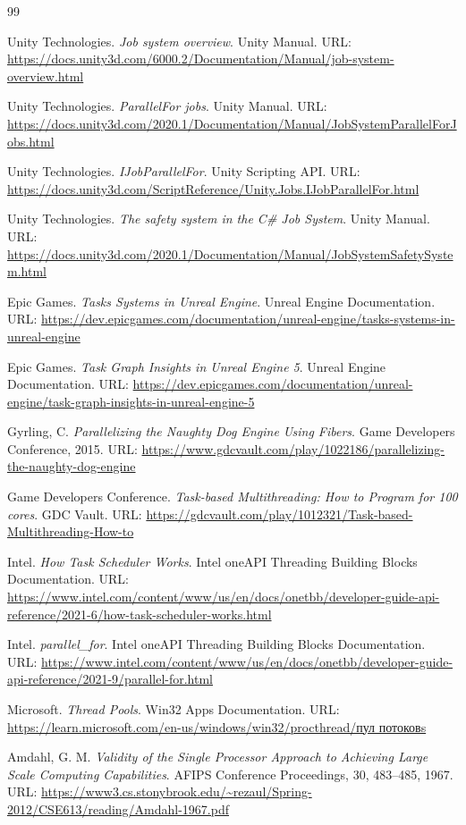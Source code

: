 \documentclass[14pt,a4paper,oneside]{extreport}
\begin{document}
\begin{thebibliography}{99}

Unity Technologies.
\textit{Job system overview}.
Unity Manual.
URL: \url{https://docs.unity3d.com/6000.2/Documentation/Manual/job-system-overview.html}

Unity Technologies.
\textit{ParallelFor jobs}.
Unity Manual.
URL: \url{https://docs.unity3d.com/2020.1/Documentation/Manual/JobSystemParallelForJobs.html}

Unity Technologies.
\textit{IJobParallelFor}.
Unity Scripting API.
URL: \url{https://docs.unity3d.com/ScriptReference/Unity.Jobs.IJobParallelFor.html}

Unity Technologies.
\textit{The safety system in the C\# Job System}.
Unity Manual.
URL: \url{https://docs.unity3d.com/2020.1/Documentation/Manual/JobSystemSafetySystem.html}

Epic Games.
\textit{Tasks Systems in Unreal Engine}.
Unreal Engine Documentation.
URL: \url{https://dev.epicgames.com/documentation/unreal-engine/tasks-systems-in-unreal-engine}

Epic Games.
\textit{Task Graph Insights in Unreal Engine 5}.
Unreal Engine Documentation.
URL: \url{https://dev.epicgames.com/documentation/unreal-engine/task-graph-insights-in-unreal-engine-5}

Gyrling, C.
\textit{Parallelizing the Naughty Dog Engine Using Fibers}.
Game Developers Conference, 2015.
URL: \url{https://www.gdcvault.com/play/1022186/parallelizing-the-naughty-dog-engine}

Game Developers Conference.
\textit{Task-based Multithreading: How to Program for 100 cores}.
GDC Vault.
URL: \url{https://gdcvault.com/play/1012321/Task-based-Multithreading-How-to}

Intel.
\textit{How Task Scheduler Works}.
Intel oneAPI Threading Building Blocks Documentation.
URL: \url{https://www.intel.com/content/www/us/en/docs/onetbb/developer-guide-api-reference/2021-6/how-task-scheduler-works.html}

Intel.
\textit{parallel\_for}.
Intel oneAPI Threading Building Blocks Documentation.
URL: \url{https://www.intel.com/content/www/us/en/docs/onetbb/developer-guide-api-reference/2021-9/parallel-for.html}

Microsoft.
\textit{Thread Pools}.
Win32 Apps Documentation.
URL: \url{https://learn.microsoft.com/en-us/windows/win32/procthread/пул потоковs}

Amdahl, G. M.
\textit{Validity of the Single Processor Approach to Achieving Large Scale Computing Capabilities}.
AFIPS Conference Proceedings, 30, 483--485, 1967.
URL: \url{https://www3.cs.stonybrook.edu/~rezaul/Spring-2012/CSE613/reading/Amdahl-1967.pdf}

\end{thebibliography}
\end{document}
